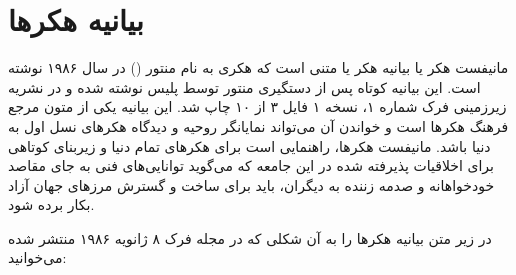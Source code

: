 \section{بیانیه هکرها}
مانیفست هکر یا بیانیه هکر یا  متنی است که هکری به نام منتور () در سال ۱۹۸۶ نوشته است. این بیانیه کوتاه پس از دستگیری منتور توسط پلیس نوشته شده و در نشریه زیرزمینی فرک شماره ۱، نسخه ۱ فایل ۳ از ۱۰ چاپ شد.
این بیانیه یکی از متون مرجع فرهنگ هکرها است و خواندن آن می‌تواند نمایانگر روحیه و دیدگاه هکرهای نسل اول به دنیا باشد. مانیفست هکرها، راهنمایی است برای هکرهای تمام دنیا و زیربنای کوتاهی برای اخلاقیات پذیرفته شده در این جامعه که می‌گوید توانایی‌های فنی به جای مقاصد خودخواهانه و صدمه زننده به دیگران، باید برای ساخت و گسترش مرزهای جهان آزاد بکار برده شود.

در زیر متن بیانیه هکرها را به آن شکلی که در مجله فرک ۸ ژانویه ۱۹۸۶ منتشر شده می‌خوانید:
